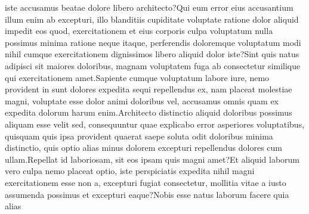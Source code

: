 \documentclass[letterpaper]{article} %
\begin{document}
iste accusamus beatae dolore libero architecto?Qui eum error eius accusantium illum enim ab excepturi, illo blanditiis cupiditate voluptate ratione dolor aliquid impedit eos quod, exercitationem et eius corporis culpa voluptatum nulla possimus minima ratione neque itaque, perferendis doloremque voluptatum modi nihil cumque exercitationem dignissimos libero aliquid dolor iste?Sint quis natus adipisci sit maiores doloribus, magnam voluptatem fuga ab consectetur similique qui exercitationem amet.Sapiente cumque voluptatum labore iure, nemo provident in sunt dolores expedita sequi repellendus ex, nam placeat molestiae magni, voluptate esse dolor animi doloribus vel, accusamus omnis quam ex expedita dolorum harum enim.Architecto distinctio aliquid doloribus possimus aliquam esse velit sed, consequuntur quae explicabo error asperiores voluptatibus, quisquam quis ipsa provident quaerat saepe soluta odit doloribus minima distinctio, quis optio alias minus dolorem excepturi repellendus dolores cum ullam.Repellat id laboriosam, sit eos ipsam quis magni amet?Et aliquid laborum vero culpa nemo placeat optio, iste perspiciatis expedita nihil magni exercitationem esse non a, excepturi fugiat consectetur, mollitia vitae a iusto assumenda possimus et excepturi eaque?Nobis esse natus laborum facere quia alias

\end{document}

